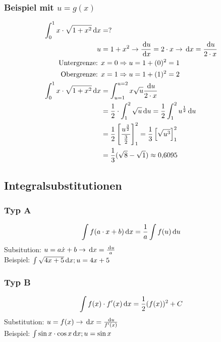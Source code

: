 \subsubsection{Beispiel mit $u = g(x)$}
\begin{align*}
	\int_{0}^{1} x \cdot \sqrt{1 + x^2} \,\mathrm dx& = ?\\
	u &= 1 + x^2 \rightarrow \frac{\,\mathrm du}{\,\mathrm dx} = 2\cdot x \rightarrow \,\mathrm dx = \frac{\,\mathrm du}{2 \cdot x}\\
	\mbox{Untergrenze: }& x = 0 \Rightarrow u = 1 + (0)^2 = 1\\
	\mbox{Obergrenze: }& x = 1 \Rightarrow u = 1 + (1)^2 = 2\\
	\int_{0}^{1} x \cdot \sqrt{1 + x^2} \,\mathrm dx& = \int_{u=1}^{u=2} x \sqrt{u} \frac{\,\mathrm du}{2 \cdot x}\\
	& = \frac{1}{2} \cdot \int_{1}^{2} \sqrt{u} \,\mathrm du = \frac{1}{2} \int_{1}^{2} u^{\frac{1}{2}} \,\mathrm du\\
	& = \frac{1}{2} \left[ \frac{u^{\frac{3}{2}}}{\frac{3}{2}} \right]_1^2 = \frac{1}{3} \left[ \sqrt{u^3} \right]_1^2\\
	& = \frac{1}{3} (\sqrt{8} - \sqrt{1}) \approx 0{,}6095
\end{align*}

\subsection{Integralsubstitutionen}
\subsubsection{Typ A}
\begin{equation*}
	\int f(a \cdot x + b) \,\mathrm dx = \frac{1}{a} \int f(u) \,\mathrm du
\end{equation*}
Subsitution: $u = a \dot x + b \rightarrow \,\mathrm dx = \frac{\,\mathrm du}{a}$\\
Beispiel: $\int \sqrt{4x + 5} \,\mathrm dx; u = 4x + 5$

\subsubsection{Typ B}
\begin{equation*}
	\int f(x) \cdot f'(x) \,\mathrm dx = \frac{1}{2} (f(x))^2 + C
\end{equation*}
Substitution: $u = f(x) \rightarrow \,\mathrm dx = \frac{\,\mathrm du}{f'(x)}$\\
Beispiel: $\int \sin x \cdot \cos x \,\mathrm dx; u = \sin x$


